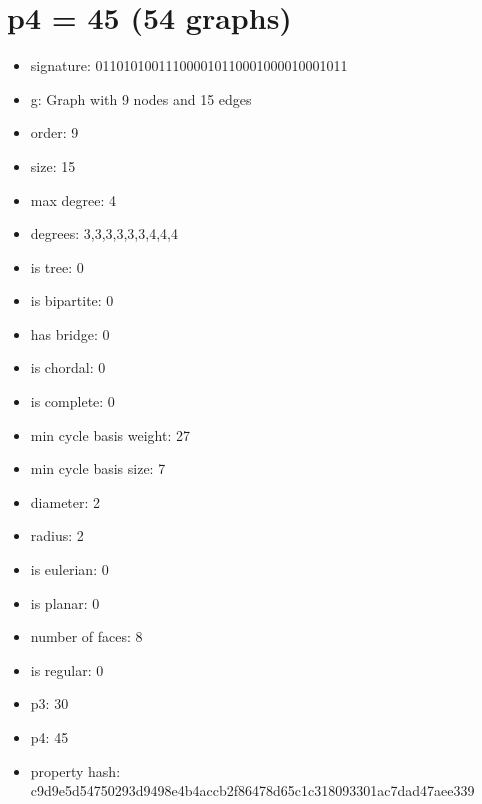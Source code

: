 \chapter{p4 = 45 (54 graphs)}
\newpage\begin{figure}
\end{figure}
\begin{itemize}
\item signature: 011010100111000010110001000010001011
\item g: Graph with 9 nodes and 15 edges
\item order: 9
\item size: 15
\item max degree: 4
\item degrees: 3,3,3,3,3,3,4,4,4
\item is tree: 0
\item is bipartite: 0
\item has bridge: 0
\item is chordal: 0
\item is complete: 0
\item min cycle basis weight: 27
\item min cycle basis size: 7
\item diameter: 2
\item radius: 2
\item is eulerian: 0
\item is planar: 0
\item number of faces: 8
\item is regular: 0
\item p3: 30
\item p4: 45
\item property hash: c9d9e5d54750293d9498e4b4accb2f86478d65c1c318093301ac7dad47aee339
\end{itemize}
